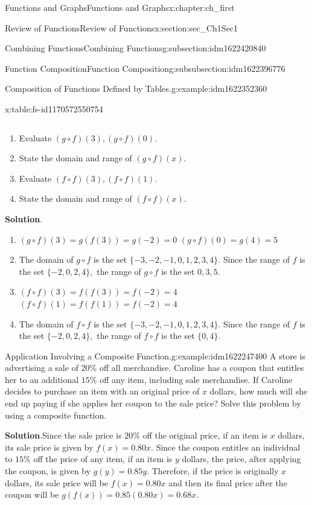 \documentclass[oneside,10pt,]{book}
\newcommand{\blocktitlefont}{\relax}
\numberwithin{equation}{section}
\begin{document}
\begin{chapterptx}{Functions and Graphs}{}{Functions and Graphs}{}{}{x:chapter:ch_first}
\begin{sectionptx}{Review of Functions}{}{Review of Functions}{}{}{x:section:sec_Ch1Sec1}
\begin{subsectionptx}{Combining Functions}{}{Combining Functions}{}{}{g:subsection:idm1622420840}
\begin{subsubsectionptx}{Function Composition}{}{Function Composition}{}{}{g:subsubsection:idm1622396776}
\begin{example}{Composition of Functions Defined by Tables.}{g:example:idm1622352360}
\begin{tableptx}{\textbf{}}{x:table:fs-id1170572550754}{}
{\begin{tabular}{llllll}
\end{tabular}
}%
\end{tableptx}%
%
\begin{enumerate}
\item{}Evaluate \((g\circ f)(3),(g\circ f)(0).\)%
\item{}State the domain and range of \((g\circ f)(x).\)%
\item{}Evaluate \((f\circ f)(3),(f\circ f)(1).\)%
\item{}State the domain and range of \((f\circ f)(x).\)%
\end{enumerate}
\par\smallskip%
\noindent\textbf{\blocktitlefont Solution}.\hypertarget{g:solution:idm1622254440}{}\quad{}%
\begin{enumerate}
\item{}\((g\circ f)(3)=g(f(3))=g(-2)=0\) \((g\circ f)(0)=g(4)=5\)%
\item{}The domain of \(g\circ f\) is the set \(\{-3,-2,-1,0,1,2,3,4\}.\) Since the range of \(f\) is the set \(\{-2,0,2,4\},\) the range of \(g\circ f\) is the set \({0,3,5}.\)%
\item{}\((f\circ f)(3)=f(f(3))=f(-2)=4\) \((f\circ f)(1)=f(f(1))=f(-2)=4\)%
\item{}The domain of \(f\circ f\) is the set \(\{-3,-2,-1,0,1,2,3,4\}.\) Since the range of \(f\) is the set \(\{-2,0,2,4\},\) the range of \(f\circ f\) is the set \(\{0,4\}.\)%
\end{enumerate}
\end{example}
\begin{example}{Application Involving a Composite Function.}{g:example:idm1622247400}%
A store is advertising a sale of \(20\%\) off all merchandise. Caroline has a coupon that entitles her to an additional \(15\%\) off any item, including sale merchandise. If Caroline decides to purchase an item with an original price of \(x\) dollars, how much will she end up paying if she applies her coupon to the sale price? Solve this problem by using a composite function.%
\par\smallskip%
\noindent\textbf{\blocktitlefont Solution}.\hypertarget{g:solution:idm1622247016}{}\quad{}Since the sale price is \(20\%\) off the original price, if an item is \(x\) dollars, its sale price is given by \(f(x)=0.80x.\) Since the coupon entitles an individual to \(15\%\) off the price of any item, if an item is \(y\) dollars, the price, after applying the coupon, is given by \(g(y)=0.85y.\) Therefore, if the price is originally \(x\) dollars, its sale price will be \(f(x)=0.80x\) and then its final price after the coupon will be \(g(f(x))=0.85(0.80x)=0.68x.\)%

\end{example}
\end{subsubsectionptx}
\end{subsectionptx}
\end{sectionptx}
\end{chapterptx}
\end{document}
